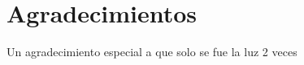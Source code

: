\chapter*{Agradecimientos}\label{chapter:agradecimientos}

Un agradecimiento especial a que solo se fue la luz 2 veces
